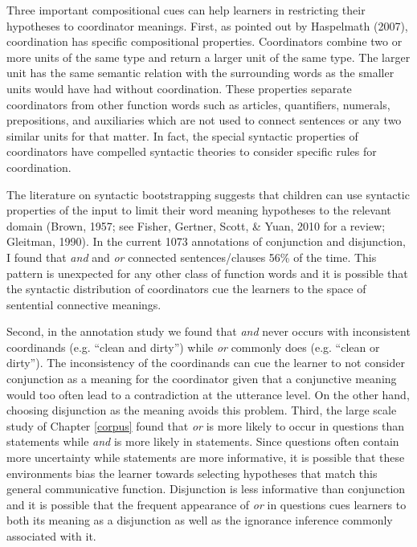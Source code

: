 \documentclass[floatsintext,man]{apa6}
\theoremstyle{definition}
\theoremstyle{definition}
\theoremstyle{definition}
\theoremstyle{remark}
\begin{document}
Three important compositional cues can help learners in restricting
their hypotheses to coordinator meanings. First, as pointed out by
Haspelmath (2007), coordination has specific compositional properties.
Coordinators combine two or more units of the same type and return a
larger unit of the same type. The larger unit has the same semantic
relation with the surrounding words as the smaller units would have had
without coordination. These properties separate coordinators from other
function words such as articles, quantifiers, numerals, prepositions,
and auxiliaries which are not used to connect sentences or any two
similar units for that matter. In fact, the special syntactic properties
of coordinators have compelled syntactic theories to consider specific
rules for coordination.

The literature on syntactic bootstrapping suggests that children can use
syntactic properties of the input to limit their word meaning hypotheses
to the relevant domain (Brown, 1957; see Fisher, Gertner, Scott, \&
Yuan, 2010 for a review; Gleitman, 1990). In the current 1073
annotations of conjunction and disjunction, I found that \emph{and} and
\emph{or} connected sentences/clauses 56\% of the time. This pattern is
unexpected for any other class of function words and it is possible that
the syntactic distribution of coordinators cue the learners to the space
of sentential connective meanings.

Second, in the annotation study we found that \emph{and} never occurs
with inconsistent coordinands (e.g. \enquote{clean and dirty}) while
\emph{or} commonly does (e.g. \enquote{clean or dirty}). The
inconsistency of the coordinands can cue the learner to not consider
conjunction as a meaning for the coordinator given that a conjunctive
meaning would too often lead to a contradiction at the utterance level.
On the other hand, choosing disjunction as the meaning avoids this
problem. Third, the large scale study of Chapter \ref{corpus} found that
\emph{or} is more likely to occur in questions than statements while
\emph{and} is more likely in statements. Since questions often contain
more uncertainty while statements are more informative, it is possible
that these environments bias the learner towards selecting hypotheses
that match this general communicative function. Disjunction is less
informative than conjunction and it is possible that the frequent
appearance of \emph{or} in questions cues learners to both its meaning
as a disjunction as well as the ignorance inference commonly associated
with it.
\end{document}
